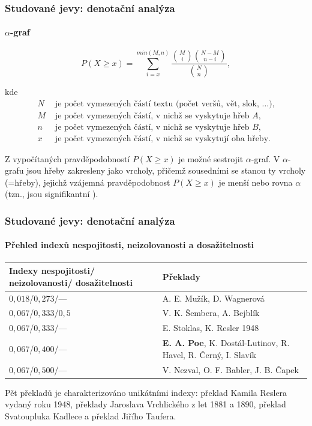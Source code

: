 \documentclass[12pt]{beamer}
\begin{document}
\begin{frame}
	\frametitle{Studované jevy:  denotační analýza}
	\framesubtitle{$\alpha$-graf}

	\vspace{-15pt}
	\begin{equation*}
		P(X \geq x)=\sum_{i=x}^{min{\left(  M, n \right) }} \frac{\binom{M}{i}\binom{N-M}{n-i}}{\binom{N}{n}},
	\end{equation*}
	\vspace{-16pt}
	\begin{small}
		kde
		\vspace{5pt} 
		\begin{align*}
			N & \text{ je počet vymezených částí textu (počet veršů, vět, slok, \ldots),}\\
			M & \text{ je počet vymezených částí, v nichž se vyskytuje hřeb $A$,}\\
			n & \text{ je počet vymezených částí, v nichž se vyskytuje hřeb $B$,}\\
			x & \text{ je počet vymezených částí, v nichž se vyskytují oba hřeby.}
		\end{align*}  
	\end{small}

	\vspace{-35pt}
	Z vypočítaných pravděpodobností $P(X\geq x)$ je možné sestrojit $\alpha$-graf. V $\alpha$-grafu jsou hřeby zakresleny jako vrcholy, přičemž sousedními se stanou ty vrcholy (=hřeby), jejichž vzájemná pravděpodobnost $P(X\geq x)$ je menší nebo rovna $\alpha$ (tzn., jsou signifikantní ).

\end{frame}

\begin{frame}
	\frametitle{Studované jevy:  denotační analýza}
	\framesubtitle{Přehled indexů nespojitosti, neizolovanosti a dosažitelnosti}

	\begin{tabular}{| p{4.0cm}|p{7.0cm}|}
	\hline
		\bfseries 
		Indexy nespojitosti/ neizolovanosti/ \mbox{dosažitelnosti} & \bfseries Překlady \\ 
	\hline $0{,}018$/$0{,}273$/---       & A. E. Mužík, D. Wagnerová \\ 
	\hline $0{,}067$/$0{,}333$/$0{,}5$	 & V. K. Šembera, A. Bejblík \\ 
	\hline $0{,}067$/$0{,}333$/---       & E. Stoklas, K. Resler 1948 \\ 
	\hline $0{,}067$/$0{,}400$/---       & \textbf{E. A. Poe}, K. Dostál-Lutinov, R. Havel, R. Černý, I. Slavík \\ 
	\hline $0{,}067$/$0{,}500$/---       & V. Nezval, O. F. Babler, J. B. Čapek \\ 
	\hline 
	\end{tabular} 
	
	Pět překladů je charakterizováno unikátními indexy: překlad Kamila Reslera vydaný roku 1948, překlady Jaroslava Vrchlického z let 1881 a 1890, překlad Svatoupluka Kadlece a překlad Jiřího Taufera.

\end{frame}
\end{document}
